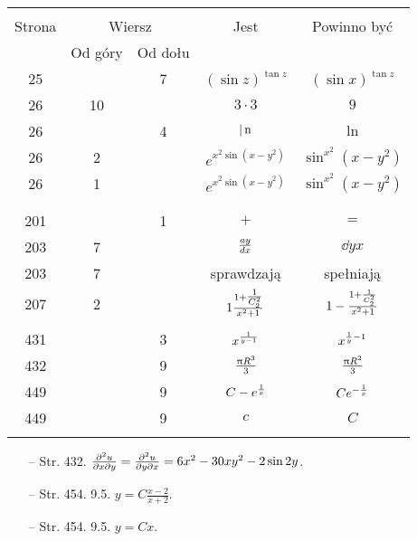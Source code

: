 \documentclass[a4paper,11pt]{article}
\begin{document}
\begin{center}
  \begin{tabular}{|c|c|c|c|c|}
    \hline
    & \multicolumn{2}{c|}{} & & \\
    Strona & \multicolumn{2}{c|}{Wiersz}& Jest & Powinno być \\ \cline{2-3}
    & Od góry & Od dołu &  &  \\ \hline
    25 & & 7 & $( \sin z )^{ \tan z }$ & $( \sin x )^{ \tan z }$ \\
    26 & 10 & & $3 \cdot 3$ & $9$ \\
    26 & & 4 & $|\, \mathrm{n}$ & $\ln$ \\
    26 & 2 & & $e^{ x^{ 2 } \sin(x - y^{ 2 }) }$
           & $\sin^{ x^{ 2 } }(x - y^{ 2 })$ \\
    26 & 1 & & $e^{ x^{ 2 } \sin(x - y^{ 2 }) }$
           & $\sin^{ x^{ 2 } }(x - y^{ 2 })$ \\
    & & & & \\
    & & & & \\
    201 & & 1 & $+$ & $=$ \\
    203 & 7 & & $\frac{ a y }{ d x }$ & $\dd{}{ y }{ x }$ \\
    203 & 7 & & sprawdzają & spełniają \\
    207 & 2 & & $1 \frac{ 1 + \tfrac{ 1 }{ C_{ 2 }^{ 2 } } }
                { x^{ 2 } + 1 }$
           & $1 - \frac{ 1 + \frac{ 1 }{ C_{ 2 }^{ 2 } } }
             { x^{ 2 } + 1 }$ \\
    & & & & \\
    431 & & 3 & $x^{ \frac{ 1 }{ y - 1 } }$ & $x^{ \frac{ 1 }{ y } - 1 }$ \\
    432 & & 9 & $\frac{\uppi R^{ 3 } }{ 3 }$ & $\frac{\uppi R^{ 2 } }{ 3 }$ \\
    449 & & 9 & $C - e^{ \frac{ 1 }{ x } }$ & $C e^{ -\frac{ 1 }{ x } }$ \\
    449 & & 9 & $c$ & $C$ \\
    & & & & \\ \hline
  \end{tabular}
\end{center}

\begin{itemize}
\item[--] Str. 432.
  $\frac{ \partial^{ 2 } u }{ \partial x \partial y } = \frac{ \partial^{ 2 } u }{ \partial y \partial x
  } = 6 x^{ 2 } - 30 x y^{ 2 } - 2 \sin 2y$.

\item[--] Str. 454. 9.5. $y = C \frac{ x - 2 }{ x + 2 }$.

\item[--] Str. 454. 9.5. $y = C x$.

\end{itemize}
\end{document}
